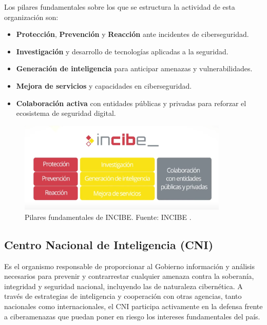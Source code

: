 \documentclass[a4paper, 10pt]{article}
\begin{document}
\par\vspace{0.5cm}

Los pilares fundamentales sobre los que se estructura la actividad de esta organización son:
\begin{itemize}
\item \textbf{Protección}, \textbf{Prevención} y \textbf{Reacción} ante incidentes de ciberseguridad.
\item \textbf{Investigación} y desarrollo de tecnologías aplicadas a la seguridad.
\item \textbf{Generación de inteligencia} para anticipar amenazas y vulnerabilidades.
\item \textbf{Mejora de servicios} y capacidades en ciberseguridad.
\item \textbf{Colaboración activa} con entidades públicas y privadas para reforzar el ecosistema de seguridad digital.
\end{itemize}

\begin{figure}[H]
\centering
\includegraphics[width=10cm]{images/incibe.png}
\caption{Pilares fundamentales de INCIBE. Fuente: INCIBE \cite{incibe}.}
\label{fig:incibe-pilares}
\end{figure}

\par\vspace{0.5cm}
\subsection*{Centro Nacional de Inteligencia (CNI)}

Es el organismo responsable de proporcionar al Gobierno información y análisis necesarios para prevenir y contrarrestar cualquier amenaza contra la soberanía, integridad y seguridad nacional, incluyendo las de naturaleza cibernética. A través de estrategias de inteligencia y cooperación con otras agencias, tanto nacionales como internacionales, el CNI participa activamente en la defensa frente a ciberamenazas que puedan poner en riesgo los intereses fundamentales del país. \cite{cni}
\par\vspace{0.5cm}
\end{document}
